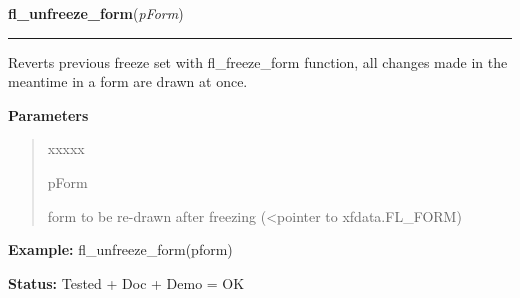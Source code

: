     \label{xformslib:library:fl_unfreeze_form}

    \vspace{0.5ex}

\hspace{.8\funcindent}\begin{boxedminipage}{\funcwidth}

    \raggedright \textbf{fl\_unfreeze\_form}(\textit{pForm})

    \vspace{-1.5ex}

    \rule{\textwidth}{0.5\fboxrule}
\setlength{\parskip}{2ex}
    Reverts previous freeze set with fl\_freeze\_form function, all changes
    made in the meantime in a form are drawn at once.

\setlength{\parskip}{1ex}
      \textbf{Parameters}
      \vspace{-1ex}

      \begin{quote}
        \begin{Ventry}{xxxxx}

          \item[pForm]

          form to be re-drawn after freezing ({\textless}pointer to 
          xfdata.FL\_FORM)

        \end{Ventry}

      \end{quote}

\textbf{Example:} fl\_unfreeze\_form(pform)



\textbf{Status:} Tested + Doc + Demo = OK



    \end{boxedminipage}

    \label{xformslib:library:fl_deactivate_form}

    \vspace{0.5ex}


